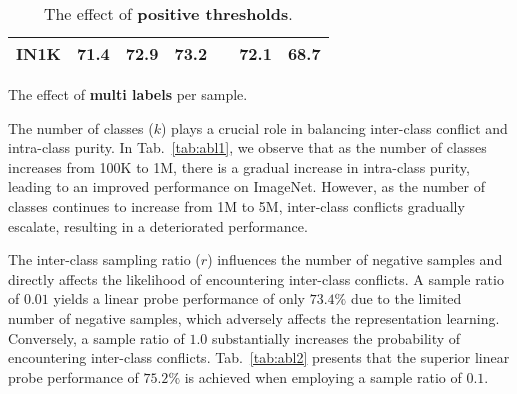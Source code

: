 \begin{table}[t]
\begin{subtable}{.495\textwidth}
{\begin{tabular}{y{80}|x{25}x{25}x{25}x{25}x{25}x{25}}
                IN1K             & 71.4 & 72.9 & 73.2 &  & 72.1 & 68.7 \\
                \bottomrule
            \end{tabular}
        }
        \caption{The effect of \textbf{multi labels} per sample.}
        \label{tab:abl3}
    \end{subtable}%
    \hfill
    \begin{subtable}{.495\textwidth}
        \caption{The effect of \textbf{positive thresholds}.}
        \label{tab:abl4}
    \end{subtable}%

\end{table}

The number of classes ($k$) plays a crucial role in balancing inter-class conflict and intra-class purity. In Tab.~\ref{tab:abl1}, we observe that as the number of classes increases from 100K to 1M, there is a gradual increase in intra-class purity, leading to an improved performance on ImageNet. However, as the number of classes continues to increase from 1M to 5M, inter-class conflicts gradually escalate, resulting in a deteriorated performance. 

The inter-class sampling ratio ($r$) influences the number of negative samples and directly affects the likelihood of encountering inter-class conflicts. A sample ratio of $0.01$ yields a linear probe performance of only $73.4\%$ due to the limited number of negative samples, which adversely affects the representation learning. Conversely, a sample ratio of $1.0$ substantially increases the probability of encountering inter-class conflicts. Tab.~\ref{tab:abl2} presents that the superior linear probe performance of $75.2\%$ is achieved when employing a sample ratio of $0.1$.

